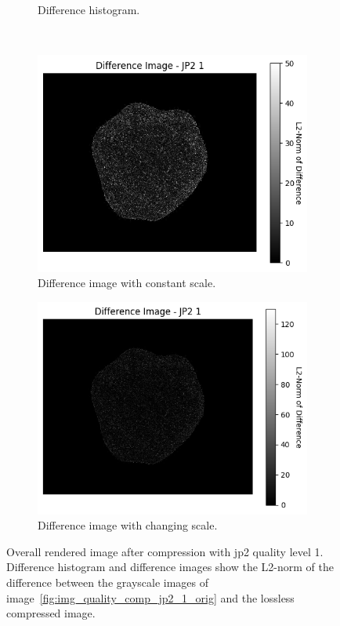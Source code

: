 \begin{figure}[htb]
\begin{subfigure}[b]{0.48\textwidth}
        \caption{Difference histogram.}
        \label{fig:img_quality_comp_jp2_1_histo}
    \end{subfigure}
    \\
    \begin{subfigure}[b]{0.48\textwidth}
        \centering
        \includegraphics[width=\textwidth]{doc/thesis/0_figures/compare_quality/set1/jp2_1_diff_heatmap.png}
        \caption{Difference image with constant scale.}
        \label{fig:img_quality_comp_jp2_1_diff}
    \end{subfigure}
    \begin{subfigure}[b]{0.48\textwidth}
        \centering
        \includegraphics[width=\textwidth]{doc/thesis/0_figures/compare_quality/set1/jp2_1_diff_heatmap_rel.png}
        \caption{Difference image with changing scale.}
        \label{fig:img_quality_comp_jp2_1_diff_rel}
    \end{subfigure}
    \caption{Overall rendered image after compression with \gls{jp2} quality level 1. Difference histogram and difference images show the L2-norm of the difference between the grayscale images of image~\ref{fig:img_quality_comp_jp2_1_orig} and the lossless compressed image.}
    \label{fig:img_quality_comp_jp2_1}
\end{figure}



